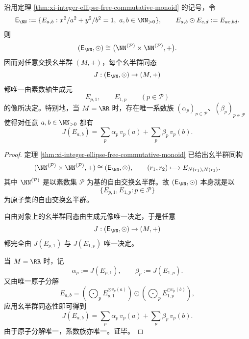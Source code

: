 \begin{proposition}\label{prop:xi-time-part63b-integer-axis-ellipse-prime-axis-rigidity}
沿用定理 \ref{thm:xi-integer-ellipse-free-commutative-monoid} 的记号，令
\[
\mathsf E_{\NN}
:=
\{E_{a,b}:x^2/a^2+y^2/b^2=1,\ a,b\in\NN_{>0}\},
\qquad
E_{a,b}\odot E_{c,d}:=E_{ac,bd}.
\]
则
\[
(\mathsf E_{\NN},\odot)
\cong
\bigl(\NN^{(\mathcal P)}\times \NN^{(\mathcal P)},+\bigr).
\]
因而对任意交换幺半群 \((M,+)\)，每个幺半群同态
\[
J:(\mathsf E_{\NN},\odot)\to (M,+)
\]
都唯一由素数轴生成元
\[
E_{p,1},\qquad E_{1,p}
\qquad(p\in\mathcal P)
\]
的像所决定。特别地，当 \(M=\RR\) 时，存在唯一系数族 \((\alpha_p)_{p\in\mathcal P}\)、\((\beta_p)_{p\in\mathcal P}\) 使得对任意 \(a,b\in\NN_{>0}\) 都有
\[
J(E_{a,b})
=
\sum_{p}\alpha_p\,v_p(a)
+
\sum_{p}\beta_p\,v_p(b).
\]
\end{proposition}
\begin{proof}
定理 \ref{thm:xi-integer-ellipse-free-commutative-monoid} 已给出幺半群同构
\[
(\NN^{(\mathcal P)}\times \NN^{(\mathcal P)},+)
\cong
(\mathsf E_{\NN},\odot),
\qquad
(r_1,r_2)\longmapsto E_{N(r_1),N(r_2)}.
\]
其中 \(\NN^{(\mathcal P)}\) 是以素数集 \(\mathcal P\) 为基的自由交换幺半群。故 \((\mathsf E_{\NN},\odot)\) 本身就是以
\[
\{E_{p,1},E_{1,p}:p\in\mathcal P\}
\]
为原子集的自由交换幺半群。

自由对象上的幺半群同态由生成元像唯一决定，于是任意
\[
J:(\mathsf E_{\NN},\odot)\to (M,+)
\]
都完全由 \(J(E_{p,1})\) 与 \(J(E_{1,p})\) 唯一决定。

当 \(M=\RR\) 时，记
\[
\alpha_p:=J(E_{p,1}),
\qquad
\beta_p:=J(E_{1,p}).
\]
又由唯一原子分解
\[
E_{a,b}
=
\left(\bigodot_{p}E_{p,1}^{\odot v_p(a)}\right)
\odot
\left(\bigodot_{p}E_{1,p}^{\odot v_p(b)}\right),
\]
应用幺半群同态性即可得到
\[
J(E_{a,b})
=
\sum_{p}\alpha_p\,v_p(a)
+
\sum_{p}\beta_p\,v_p(b).
\]
由于原子分解唯一，系数族亦唯一。证毕。
\end{proof}

\endinput
